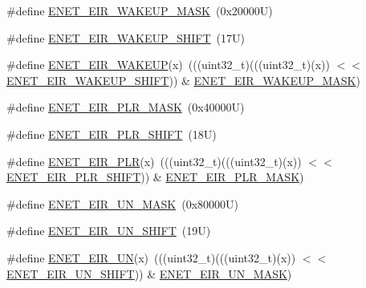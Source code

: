 \begin{DoxyCompactItemize}
\item 
\#define \mbox{\hyperlink{group___e_n_e_t___register___masks_ga0fbd5b05a2c5421000b0a2aa1ee1565a}{E\+N\+E\+T\+\_\+\+E\+I\+R\+\_\+\+W\+A\+K\+E\+U\+P\+\_\+\+M\+A\+SK}}~(0x20000\+U)
\item 
\#define \mbox{\hyperlink{group___e_n_e_t___register___masks_gaca3f3ef47646913b04686a282364408d}{E\+N\+E\+T\+\_\+\+E\+I\+R\+\_\+\+W\+A\+K\+E\+U\+P\+\_\+\+S\+H\+I\+FT}}~(17\+U)
\item 
\#define \mbox{\hyperlink{group___e_n_e_t___register___masks_gab55432c2f22ea6da19ccea5c76afff4d}{E\+N\+E\+T\+\_\+\+E\+I\+R\+\_\+\+W\+A\+K\+E\+UP}}(x)~(((uint32\+\_\+t)(((uint32\+\_\+t)(x)) $<$$<$ \mbox{\hyperlink{group___e_n_e_t___register___masks_gaca3f3ef47646913b04686a282364408d}{E\+N\+E\+T\+\_\+\+E\+I\+R\+\_\+\+W\+A\+K\+E\+U\+P\+\_\+\+S\+H\+I\+FT}})) \& \mbox{\hyperlink{group___e_n_e_t___register___masks_ga0fbd5b05a2c5421000b0a2aa1ee1565a}{E\+N\+E\+T\+\_\+\+E\+I\+R\+\_\+\+W\+A\+K\+E\+U\+P\+\_\+\+M\+A\+SK}})
\item 
\#define \mbox{\hyperlink{group___e_n_e_t___register___masks_ga23e353e0ca4a78c50becad48aa46c4ec}{E\+N\+E\+T\+\_\+\+E\+I\+R\+\_\+\+P\+L\+R\+\_\+\+M\+A\+SK}}~(0x40000\+U)
\item 
\#define \mbox{\hyperlink{group___e_n_e_t___register___masks_gabdf57205ac58e2b4015341f739ee1150}{E\+N\+E\+T\+\_\+\+E\+I\+R\+\_\+\+P\+L\+R\+\_\+\+S\+H\+I\+FT}}~(18\+U)
\item 
\#define \mbox{\hyperlink{group___e_n_e_t___register___masks_ga78758f4f442de535683bd0ec4ea25542}{E\+N\+E\+T\+\_\+\+E\+I\+R\+\_\+\+P\+LR}}(x)~(((uint32\+\_\+t)(((uint32\+\_\+t)(x)) $<$$<$ \mbox{\hyperlink{group___e_n_e_t___register___masks_gabdf57205ac58e2b4015341f739ee1150}{E\+N\+E\+T\+\_\+\+E\+I\+R\+\_\+\+P\+L\+R\+\_\+\+S\+H\+I\+FT}})) \& \mbox{\hyperlink{group___e_n_e_t___register___masks_ga23e353e0ca4a78c50becad48aa46c4ec}{E\+N\+E\+T\+\_\+\+E\+I\+R\+\_\+\+P\+L\+R\+\_\+\+M\+A\+SK}})
\item 
\#define \mbox{\hyperlink{group___e_n_e_t___register___masks_ga6bcda0d283c8681a624a9486dc5aedd3}{E\+N\+E\+T\+\_\+\+E\+I\+R\+\_\+\+U\+N\+\_\+\+M\+A\+SK}}~(0x80000\+U)
\item 
\#define \mbox{\hyperlink{group___e_n_e_t___register___masks_ga0fe318423bbdaea2e6d5731654850bc1}{E\+N\+E\+T\+\_\+\+E\+I\+R\+\_\+\+U\+N\+\_\+\+S\+H\+I\+FT}}~(19\+U)
\item 
\#define \mbox{\hyperlink{group___e_n_e_t___register___masks_gad80bd1978dae2fe816eec18c09ec27bb}{E\+N\+E\+T\+\_\+\+E\+I\+R\+\_\+\+UN}}(x)~(((uint32\+\_\+t)(((uint32\+\_\+t)(x)) $<$$<$ \mbox{\hyperlink{group___e_n_e_t___register___masks_ga0fe318423bbdaea2e6d5731654850bc1}{E\+N\+E\+T\+\_\+\+E\+I\+R\+\_\+\+U\+N\+\_\+\+S\+H\+I\+FT}})) \& \mbox{\hyperlink{group___e_n_e_t___register___masks_ga6bcda0d283c8681a624a9486dc5aedd3}{E\+N\+E\+T\+\_\+\+E\+I\+R\+\_\+\+U\+N\+\_\+\+M\+A\+SK}})
$$
\end{DoxyCompactItemize}
